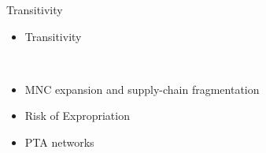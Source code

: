 \documentclass{beamer}
\begin{document}
\begin{frame}{Transitivity}

\begin{itemize}
\item{Transitivity}

\\
\justifying
\item{MNC expansion and supply-chain fragmentation}
\item{Risk of Expropriation}
\item{PTA networks}

\end{itemize}


\end{frame}
\end{document}
